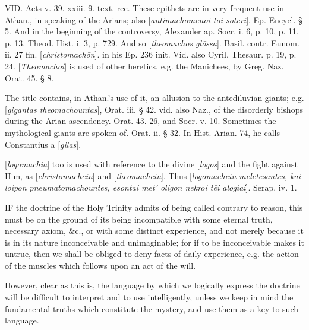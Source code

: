 
VID.
Acts v. 39. xxiii. 9. text. rec. These epithets are in very frequent
use in Athan., in speaking of the Arians; also [\emph{antimachomenoi t\={o}i
s\={o}t\={e}ri}]. Ep. Encycl. § 5. And in the beginning of
the controversy, Alexander ap. Socr. i. 6, p. 10, p. 11, p. 13. Theod.
Hist. i. 3, p. 729. And so [\emph{theomachos gl\={o}ssa}]. Basil.
contr. Eunom. ii. 27 fin. [\emph{christomach\={o}n}]. in his Ep.
236 init. Vid. also Cyril. Thesaur. p. 19, p. 24. [\emph{Theomachoi}]
is used of other heretics, e.g. the Manichees, by Greg. Naz. Orat. 45.
§ 8.

The title contains, in Athan.'s use of it, an
allusion to the antediluvian giants; e.g. [\emph{gigantas theomachountas}],
Orat. iii. § 42. vid. also Naz., of the disorderly bishops during the
Arian ascendency. Orat. 43. 26, and Socr. v. 10. Sometimes the
mythological giants are spoken of. Orat. ii. § 32. In Hist. Arian.
74, he calls Constantius a [\emph{gilas}].

[\emph{logomachia}] too is used with reference to
the divine [\emph{logos}] and the fight against Him, as [\emph{christomachein}]
and [\emph{theomachein}]. Thus [\emph{logomachein melet\={e}santes,
kai loipon pneumatomachountes, esontai met'
oligon nekroi t\={e}i alogiai}]. Serap. iv. 1.


IF
the doctrine of the Holy Trinity admits of being called contrary to
reason, this must be on the ground of its being incompatible with some
eternal truth, necessary axiom, \&c., or with some distinct
experience, and not merely because it is in its nature inconceivable
and unimaginable; for if to be inconceivable makes it untrue, then we
shall be obliged to deny facts of daily experience, e.g. the action of
the muscles which follows upon an act of the will.

However, clear as this is, the language by which
we logically express the doctrine will be difficult to interpret and
to use intelligently, unless we keep in mind the fundamental truths
which constitute the mystery, and use them as a key to such language.

